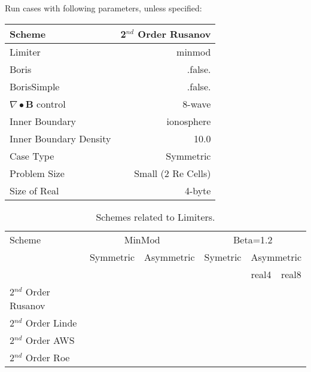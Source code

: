 \documentclass[10pt]{article}
\begin{document}
Run cases with following parameters, unless specified:

\begin{table}[!h]
\begin{tabular}{|l|r|} \hline
Scheme  & 2$^{nd}$ Order Rusanov  \\ \hline
Limiter & minmod  \\ \hline
Boris & .false. \\ \hline
BorisSimple & .false. \\ \hline
$\nabla \bullet \mathbf{B}$ control & 8-wave \\ \hline
Inner Boundary & ionosphere \\ \hline
Inner Boundary Density & 10.0 \\ \hline
Case Type  & Symmetric \\ \hline
Problem Size & Small (2 Re Cells) \\ \hline
Size of Real & 4-byte \\ \hline
\end{tabular}
\end{table} 



\begin{table}[!h]
\begin{tabular}{|l|c|c|c|c|c|} \hline
Scheme                   & \multicolumn{2}{c|}{MinMod} & \multicolumn{3}{c|}{Beta=1.2} \\ \cline{2-6}
                         &  Symmetric & Asymmetric & Symetric & \multicolumn{2}{c|}{Asymmetric}  \\  \cline{5-6}
                         &            &            &          & real4 & real8  \\ \hline
2$^{nd}$ Order Rusanov   &  &&     &   &        \\ \hline
2$^{nd}$ Order Linde     &  &&     &   &        \\ \hline
2$^{nd}$ Order AWS       &  &&     &   &        \\ \hline
2$^{nd}$ Order Roe       &  &&     &   &        \\ \hline
\end{tabular}
\caption{Schemes related to Limiters.}
\end{table} 
\end{document}
